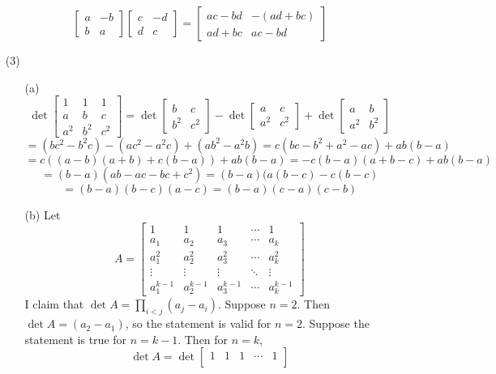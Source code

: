 \begin{itemize}
$$\begin{bmatrix}
a & -b \\
b & a
\end{bmatrix}\begin{bmatrix}
c & -d \\
d & c
\end{bmatrix} = \begin{bmatrix}
ac - bd & -(ad + bc) \\
ad + bc & ac - bd
\end{bmatrix}$$
\item[(3)]
\begin{itemize}
\item[(a)]
$$\det\begin{bmatrix}
1 & 1 & 1 \\
a & b & c \\
a^2 & b^2 & c^2
\end{bmatrix} = \det\begin{bmatrix}
b & c \\
b^2 & c^2
\end{bmatrix} - \det\begin{bmatrix}
a & c \\
a^2 & c^2
\end{bmatrix} + \det\begin{bmatrix}
a & b \\
a^2 & b^2
\end{bmatrix}$$
$$= (bc^2 - b^2c) - (ac^2 - a^2c) + (ab^2 - a^2b) = c(bc  - b^2 + a^2 - ac) + ab(b - a)$$
$$= c((a - b)(a + b) + c(b - a)) + ab(b - a) = -c(b - a)(a + b - c) + ab(b - a)$$
$$= (b - a)(ab - ac - bc + c^2) = (b - a)(a(b - c) - c(b - c)$$
$$= (b - a)(b - c)(a - c) = (b - a)(c - a)(c - b)$$
\item[(b)]
Let 
$$A = \begin{bmatrix}
1 & 1 & 1 & \cdots & 1 \\
a_1 & a_2 & a_3 & \cdots & a_k \\
a_1^2 & a_2^2 & a_3^2 & \cdots & a_k^2 \\
\vdots & \vdots & \vdots & \ddots & \vdots \\
a_1^{k-1} & a_2^{k-1} & a_3^{k-1} & \cdots & a_k^{k-1}
\end{bmatrix}$$
I claim that $\det A = \prod_{i < j}(a_j - a_i)$. Suppose $n = 2$. Then $\det A = (a_2 - a_1)$, so the statement is valid for $n = 2$. Suppose the statement is true for $n = k - 1$. Then for $n = k$,
$$\det A = \det\begin{bmatrix}
1 & 1 & 1 & \cdots & 1 \\

\end{bmatrix}$$
\end{itemize}
\end{itemize}
